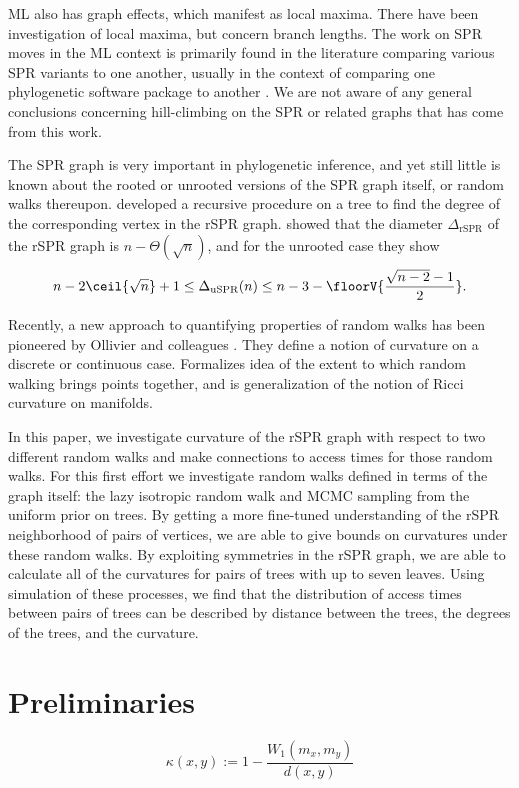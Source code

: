 \documentclass{amsart}
\begin{document}
ML also has graph effects, which manifest as local maxima.
There have been investigation of local maxima, but concern branch lengths.
\cite{Fukami1989-fs,Steel1994-pt,Chor2003-wh,Chor2000-ea}
The work on SPR moves in the ML context is primarily found in the literature comparing various SPR variants to one another, usually in the context of comparing one phylogenetic software package to another \cite{Hordijk2005-dl,Stamatakis2006-yz,Price2010-fi,Guindon2010-lo}.
We are not aware of any general conclusions concerning hill-climbing on the SPR or related graphs that has come from this work.

The SPR graph is very important in phylogenetic inference, and yet still little is known about the rooted or unrooted versions of the SPR graph itself, or random walks thereupon.
\cite{Song2003-gf} developed a recursive procedure on a tree to find the degree of the corresponding vertex in the rSPR graph.
\cite{Ding2011-bj} showed that the diameter $\Delta_{\text{rSPR}}$ of the rSPR graph is $n - \Theta(\sqrt n)$, and for the unrooted case they show
$$ n - 2\ceil{\sqrt{n}} + 1
\le \Delta_{\text{uSPR}}(n)
\le n - 3 - \floorV{\frac{\sqrt{n - 2} - 1}{2}}.
$$

Recently, a new approach to quantifying properties of random walks has been pioneered by Ollivier and colleagues \cite{Ollivier2009-bw,Joulin2010-jg}.
They define a notion of curvature on a discrete or continuous case.
Formalizes idea of the extent to which random walking brings points together, and is generalization of the notion of Ricci curvature on manifolds.

In this paper, we investigate curvature of the rSPR graph with respect to two different random walks and make connections to access times for those random walks.
For this first effort we investigate random walks defined in terms of the graph itself: the lazy isotropic random walk and MCMC sampling from the uniform prior on trees.
By getting a more fine-tuned understanding of the rSPR neighborhood of pairs of vertices, we are able to give bounds on curvatures under these random walks.
By exploiting symmetries in the rSPR graph, we are able to calculate all of the curvatures for pairs of trees with up to seven leaves.
Using simulation of these processes, we find that the distribution of access times between pairs of trees can be described by distance between the trees, the degrees of the trees, and the curvature.


\section{Preliminaries}
\[
\kappa(x, y) := 1 - \frac{W_1(m_x, m_y)}{d(x, y)}
\]
\end{document}

